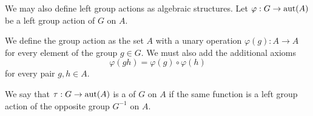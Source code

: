 \begin{remark}\label{remark:left_group_actions_as_algebraic_structures}
  We may also define left group actions as algebraic structures. Let \( \varphi: G \to \operatorname{aut}(A) \) be a left group action of \( G \) on \( A \).

  We define the group action as the set \( A \) with a unary operation \( \varphi(g): A \to A \) for every element of the group \( g \in G \). We must also add the additional axioms
  \begin{equation*}
    \varphi(gh) = \varphi(g) \circ \varphi(h)
  \end{equation*}
  for every pair \( g, h \in A \).
\end{remark}

\begin{definition}\label{def:right_group_action}
  We say that \( \tau: G \to \operatorname{aut}(A) \) is a  of \( G \) on \( A \) if the same function is a left group action of the opposite group \( G^{-1} \) on \( A \).
\end{definition}
